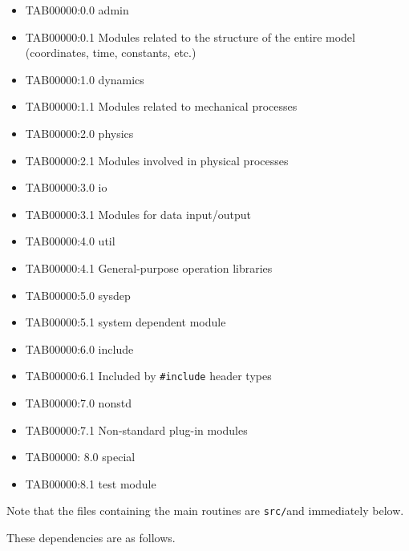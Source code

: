 \begin{itemize}
\item
  TAB00000:0.0 admin
\item
  TAB00000:0.1 Modules related to the structure of the entire model
  (coordinates, time, constants, etc.)
\item
  TAB00000:1.0 dynamics
\item
  TAB00000:1.1 Modules related to mechanical processes
\item
  TAB00000:2.0 physics
\item
  TAB00000:2.1 Modules involved in physical processes
\item
  TAB00000:3.0 io
\item
  TAB00000:3.1 Modules for data input/output
\item
  TAB00000:4.0 util
\item
  TAB00000:4.1 General-purpose operation libraries
\item
  TAB00000:5.0 sysdep
\item
  TAB00000:5.1 system dependent module
\item
  TAB00000:6.0 include
\item
  TAB00000:6.1 {Included by \texttt{\#include}} header types
\item
  TAB00000:7.0 nonstd
\item
  TAB00000:7.1 Non-standard plug-in modules
\item
  TAB00000: 8.0 special
\item
  TAB00000:8.1 test module
\end{itemize}

Note that the files containing the main routines are {\texttt{src/}}and
immediately below.

These dependencies are as follows.

